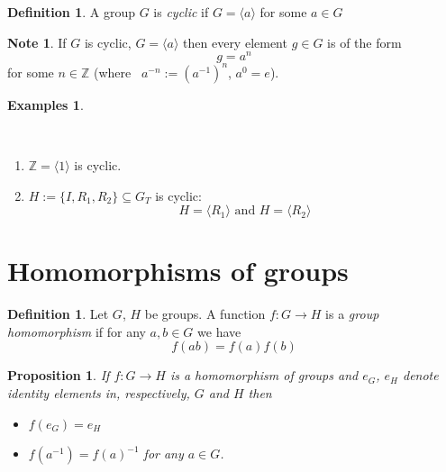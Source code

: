 \documentclass[12pt, letterpaper, oneside]{article}
\theoremstyle{plain}
\newtheorem{proposition}[theorem]{Proposition}
\theoremstyle{definition}
\newtheorem{definition}[theorem]{Definition}
\newtheorem{examples}[theorem]{Examples}
\newtheorem{note}[theorem]{Note}
\newcommand{\Z}{{\mathbb Z}}
\newcommand{\subgp}[1]{\langle#1\rangle}
\newcommand{\vs}{\vskip 5mm}
\begin{document}
\vskip 5mm 

\begin{definition}
A group $G$ is \emph{cyclic} if $G =\subgp{a}$ for some $a\in G$
\end{definition}

\vskip 5mm

\begin{note}
If $G$ is cyclic, $G= \subgp{a}$ then every element  $g\in G$ is of the form
$$g=a^{n}$$
for some $n\in \Z$  (where \ $a^{-n} := (a^{-1})^{n}$, $a^{0}= e$).
\end{note}

\vs

\begin{examples}\ 

\vskip -13mm

\ 
\begin{enumerate}
\item $\Z = \subgp{1}$ is cyclic.
\item $H := \{ I, R_{1}, R_{2}\}\subseteq G_{T}$ is cyclic:
$$H = \subgp{R_{1}} \text{ \ \ and \ \ }  H = \subgp{R_{2}}$$
\end{enumerate}
\end{examples}




\newpage
\section{Homomorphisms of groups}
\label{SEC_GPHOM}


\begin{definition}
\label{DEF_GP_HOMOMRPHISM}
Let $G$, $H$ be groups. A function $f\colon G\to H$ is a \emph{group homomorphism}
if for any $a,b\in G$ we have 
$$f(ab)=f(a)f(b)$$
\end{definition}

\vs

\begin{proposition}
If $f\colon G\to H$ is a homomorphism of groups and  $e_{G}$, $e_{H}$ denote identity elements
in, respectively, $G$ and $H$ then
\begin{itemize}
\item[(i)] $f(e_{G})=e_{H}$
\item[(ii)] $f(a^{-1})=f(a)^{-1}$ for any $a\in G$.
\end{itemize}
\end{proposition}
\end{document}
